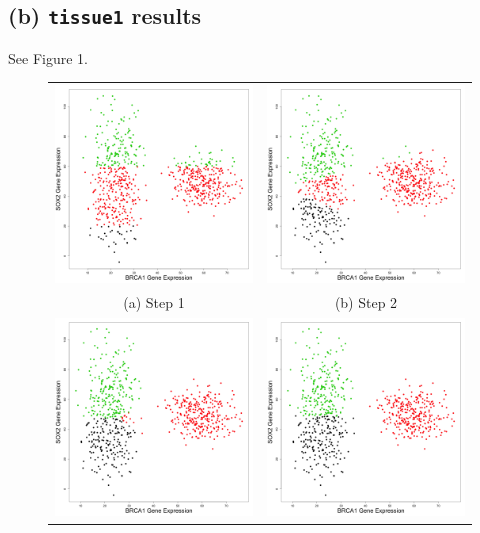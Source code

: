 \documentclass[11pt]{article}
\begin{document}
\subsection*{(b) {\tt tissue1} results}
See Figure 1.
\begin{figure}
\begin{tabular}{c c}
    \includegraphics[width=65mm]{../tissue1_plots/cluster_step1.png} & 
    \includegraphics[width=65mm]{../tissue1_plots/cluster_step2.png} \\
    (a) Step 1 & (b) Step 2 \\
    \includegraphics[width=65mm]{../tissue1_plots/cluster_step3.png} & 
    \includegraphics[width=65mm]{../tissue1_plots/cluster_step4.png} \\

\end{tabular}
\end{figure}
\end{document}
